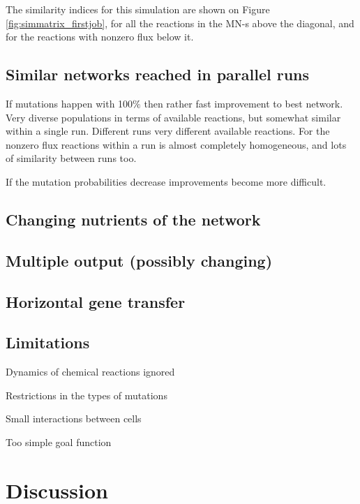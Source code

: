 \documentclass[10pt,a4paper]{article}
\begin{document}
The similarity indices for this simulation are shown on Figure \ref{fig:simmatrix_firstjob}, for all the reactions in the MN-s above the diagonal, and for the reactions with nonzero flux below it. 


\subsection{Similar networks reached in parallel runs}
\label{sub:similar_networks_reached_in_paralell_runs}
If mutations happen with 100$\%$ then rather fast improvement to best network. Very diverse populations in terms of available reactions, but somewhat similar within a single run. Different runs very different available reactions. For the nonzero flux reactions within a run is almost completely homogeneous, and lots of similarity between runs too. 

If the mutation probabilities decrease improvements become more difficult.

\subsection{Changing nutrients of the network}
\label{sub:changing_nutrients_of_the_network}

\subsection{Multiple output (possibly changing)}
\label{sub:multiple_output_possibly_changing_}

\subsection{Horizontal gene transfer}
\label{sub:horizontal_gene_transfer}


\subsection{Limitations}
\label{sub:limitations}
Dynamics of chemical reactions ignored

Restrictions in the types of mutations

Small interactions between cells

Too simple goal function



\section{Discussion}
\label{sec:discussion}
\end{document}
